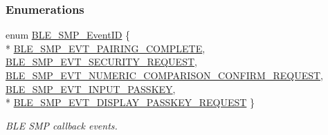 \subsubsection*{Enumerations}
\begin{DoxyCompactItemize}
\item 
enum \hyperlink{group___b_l_e___s_m_p_ga4b348bac282c69fdb7a248c83a3e55dd}{B\+L\+E\+\_\+\+S\+M\+P\+\_\+\+Event\+ID} \{ \\*
\hyperlink{group___b_l_e___s_m_p_gga4b348bac282c69fdb7a248c83a3e55dda9c28fa37325f358f809af82dd9b5a83c}{B\+L\+E\+\_\+\+S\+M\+P\+\_\+\+E\+V\+T\+\_\+\+P\+A\+I\+R\+I\+N\+G\+\_\+\+C\+O\+M\+P\+L\+E\+TE}, 
\hyperlink{group___b_l_e___s_m_p_gga4b348bac282c69fdb7a248c83a3e55dda166171e1374329833c49ac32cfeecfe8}{B\+L\+E\+\_\+\+S\+M\+P\+\_\+\+E\+V\+T\+\_\+\+S\+E\+C\+U\+R\+I\+T\+Y\+\_\+\+R\+E\+Q\+U\+E\+ST}, 
\hyperlink{group___b_l_e___s_m_p_gga4b348bac282c69fdb7a248c83a3e55ddaba306d07c7ac215ee1cf1263d4552172}{B\+L\+E\+\_\+\+S\+M\+P\+\_\+\+E\+V\+T\+\_\+\+N\+U\+M\+E\+R\+I\+C\+\_\+\+C\+O\+M\+P\+A\+R\+I\+S\+O\+N\+\_\+\+C\+O\+N\+F\+I\+R\+M\+\_\+\+R\+E\+Q\+U\+E\+ST}, 
\hyperlink{group___b_l_e___s_m_p_gga4b348bac282c69fdb7a248c83a3e55dda5c54f89fdc76d3906e63e9a13aad1efb}{B\+L\+E\+\_\+\+S\+M\+P\+\_\+\+E\+V\+T\+\_\+\+I\+N\+P\+U\+T\+\_\+\+P\+A\+S\+S\+K\+EY}, 
\\*
\hyperlink{group___b_l_e___s_m_p_gga4b348bac282c69fdb7a248c83a3e55dda88c43bc28afcdbadc22c1d6edf4cf8af}{B\+L\+E\+\_\+\+S\+M\+P\+\_\+\+E\+V\+T\+\_\+\+D\+I\+S\+P\+L\+A\+Y\+\_\+\+P\+A\+S\+S\+K\+E\+Y\+\_\+\+R\+E\+Q\+U\+E\+ST}
 \}\begin{DoxyCompactList}\small\item\em B\+LE S\+MP callback events. \end{DoxyCompactList}
\end{DoxyCompactItemize}
